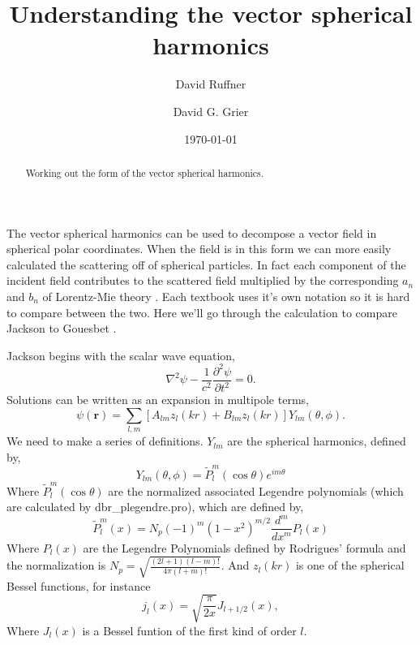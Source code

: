 \documentclass[aps,prl,twocolumn]{revtex4-1}
\begin{document}
 

\title{Understanding the vector spherical harmonics}

\author{David Ruffner}
\author{David G. Grier}

\date{\today}
\begin{abstract}
  Working out the form of the vector spherical harmonics. 




\end{abstract}



\maketitle 

The vector spherical harmonics can be used to decompose a vector field 
in spherical polar coordinates. When the field is in this form we can 
more easily calculated the scattering off of spherical particles. In fact
each component of the incident field contributes to the scattered field
multiplied by the corresponding $a_n$ and $b_n$ of Lorentz-Mie theory
\cite{bohren_absorption_2008}. Each textbook uses it's own notation so 
it is hard to compare between the two. Here we'll go through the calculation
to compare Jackson \cite{jackson_classical_1998} to
 Gouesbet \cite{gouesbet_t-matrix_2010}. 

Jackson begins with the scalar wave equation,
\begin{equation}
  \label{eq:scalarwaveeq}
  \nabla^2 \psi - \frac{1}{c^2} \frac{\partial^2 \psi}{\partial t^2} = 0.
\end{equation}
Solutions can be written as an expansion in multipole terms,
\begin{equation}
  \label{eq:generalscalarsolution}
  \psi(\mathbf{r}) = \sum_{l,m} [A_{lm}z_l(kr)+B_{lm}z_l(kr)]Y_{lm}(\theta,\phi).
\end{equation}
We need to make a series of definitions.
$Y_{lm}$ are the spherical harmonics, defined by,
\begin{equation}
  \label{eq:sphericalharmonic}
  Y_{lm}(\theta,\phi) =  \tilde{P}_l^m(\cos \theta) e^{im\theta}
\end{equation}
Where $\tilde{P}_l^m(\cos \theta)$ are the normalized
associated Legendre polynomials (which are calculated by dbr\_plegendre.pro),
which are defined by,
\begin{equation}
  \label{eq:normalizedassociatedlegendrep}
  \tilde{P}_l^m(x) = N_p (-1)^m (1-x^2)^{m/2} \frac{d^m}{dx^m}P_l(x)
\end{equation}
Where $P_l(x)$ are the Legendre Polynomials defined by Rodrigues' formula
and the normalization is $N_p =\sqrt{\frac{(2l+1)(l-m)!}{4 \pi (l+m)!}}$.
And $z_l(kr)$ is one of the spherical Bessel functions, for instance
\begin{equation}
  \label{eq:sphericalbessel}
  j_l(x) = \sqrt{\frac{\pi}{2 x}}J_{l+1/2}(x), 
\end{equation}
Where $J_l(x)$ is a Bessel funtion of the first kind of order $l$. 
\end{document}

